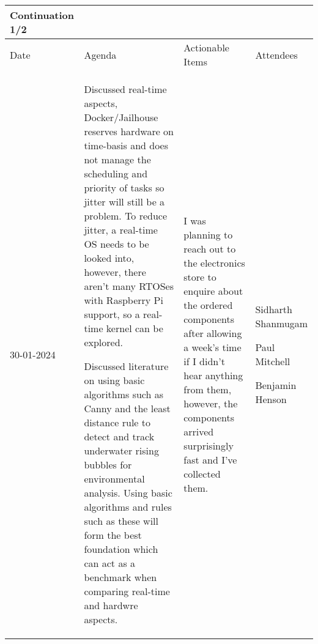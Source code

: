 \begin{table}[!h]
    \centering
    \begin{tabularx}{\textwidth}{|l|X|X|X|}
        \hline
        Continuation 1/2 \\
        \hline
        \hline
        Date & Agenda & Actionable Items & Attendees \\
        \hline
        \hline
        30-01-2024 & 
        \begin{myitemize}
            \item Discussed real-time aspects, Docker/Jailhouse reserves hardware on time-basis and does not manage the scheduling and priority of tasks so jitter will still be a problem. To reduce jitter, a real-time OS needs to be looked into, however, there aren't many RTOSes with Raspberry Pi support, so a real-time kernel can be explored.
            \item Discussed literature on using basic algorithms such as Canny and the least distance rule to detect and track underwater rising bubbles for environmental analysis. Using basic algorithms and rules such as these will form the best foundation which can act as a benchmark when comparing real-time and hardwre aspects.
        \end{myitemize} &
        \begin{myitemize}
            \item I was planning to reach out to the electronics store to enquire about the ordered components after allowing a week's time if I didn't hear anything from them, however, the components arrived surprisingly fast and I've collected them.
        \end{myitemize} &
        \begin{myitemize}
            \item Sidharth Shanmugam
            \item Paul Mitchell
            \item Benjamin Henson
        \end{myitemize} \\
        \hline
    \end{tabularx}
\end{table}

\pagebreak

